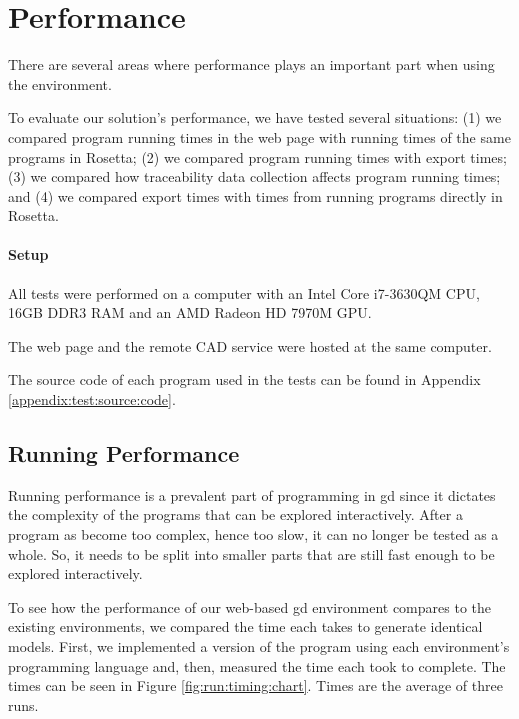 

\section{Performance}
There are several areas where performance plays an important part when using the environment.

To evaluate our solution's performance, we have tested several situations: (1) we compared program running times in the web page with running times of the same programs in Rosetta; (2) we compared program running times with export times; (3) we compared how traceability data collection affects program running times; and (4) we compared export times with times from running programs directly in Rosetta.

\paragraph{Setup}
All tests were performed on a computer with an Intel Core i7-3630QM CPU, 16GB DDR3 RAM and an AMD Radeon HD 7970M GPU.

The web page and the remote CAD service were hosted at the same computer.

The source code of each program used in the tests can be found in Appendix \ref{appendix:test:source:code}. %


\subsection{Running Performance}
Running performance is a prevalent part of programming in \gls{gd} since it dictates the complexity of the programs that can be explored interactively.
After a program as become too complex, hence too slow, it can no longer be tested as a whole.
So, it needs to be split into smaller parts that are still fast enough to be explored interactively.

To see how the performance of our web-based \gls{gd} environment compares to the existing environments, we compared the time each takes to generate identical models.
First, we implemented a version of the program using each environment's programming language and, then, measured the time each took to complete.
The times can be seen in Figure \ref{fig:run:timing:chart}.
Times are the average of three runs.


